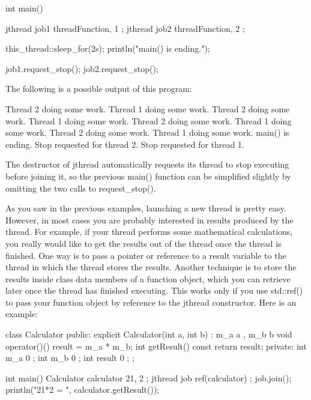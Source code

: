 \begin{cpp}
int main()
{
    jthread job1 { threadFunction, 1 };
    jthread job2 { threadFunction, 2 };

    this_thread::sleep_for(2s);
    println("main() is ending.");

    job1.request_stop();
    job2.request_stop();
}
\end{cpp}

The following is a possible output of this program:

\begin{shell}
Thread 2 doing some work.
Thread 1 doing some work.
Thread 2 doing some work.
Thread 1 doing some work.
Thread 2 doing some work.
Thread 1 doing some work.
Thread 2 doing some work.
Thread 1 doing some work.
main() is ending.
Stop requested for thread 2.
Stop requested for thread 1.
\end{shell}

The destructor of jthread automatically requests its thread to stop executing before joining it, so the previous main() function can be simplified slightly by omitting the two calls to request\_stop().


As you saw in the previous examples, launching a new thread is pretty easy. However, in most cases you are probably interested in results produced by the thread. For example, if your thread performs some mathematical calculations, you really would like to get the results out of the thread once the thread is finished. One way is to pass a pointer or reference to a result variable to the thread in which the thread stores the results. Another technique is to store the results inside class data members of a function object, which you can retrieve later once the thread has finished executing. This works only if you use std::ref() to pass your function object by reference to the jthread constructor. Here is an example:

\begin{cpp}
class Calculator
{
    public:
        explicit Calculator(int a, int b) : m_a { a }, m_b { b } {}
        void operator()() { result = m_a * m_b; }
        int getResult() const { return result; }
    private:
        int m_a { 0 };
        int m_b { 0 };
        int result { 0 };
};

int main()
{
    Calculator calculator { 21, 2 };
    jthread job { ref(calculator) };
    job.join();
    println("21*2 = {}", calculator.getResult());
}
\end{cpp}

